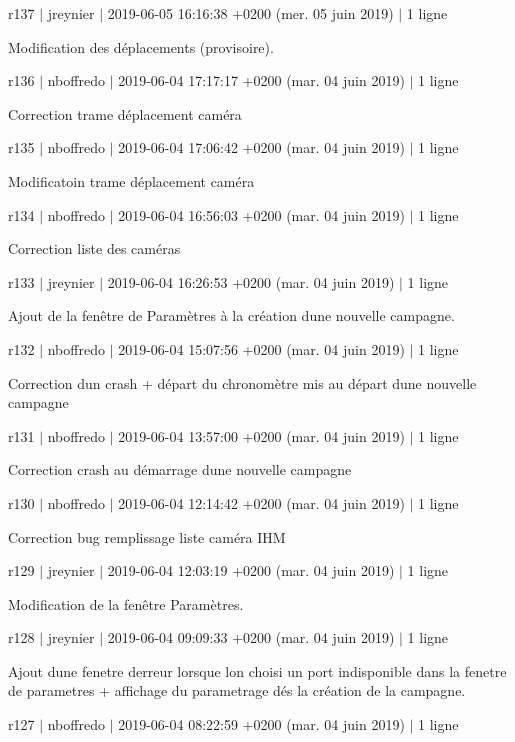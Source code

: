 r137 $\vert$ jreynier $\vert$ 2019-\/06-\/05 16\+:16\+:38 +0200 (mer. 05 juin 2019) $\vert$ 1 ligne

Modification des déplacements (provisoire).

r136 $\vert$ nboffredo $\vert$ 2019-\/06-\/04 17\+:17\+:17 +0200 (mar. 04 juin 2019) $\vert$ 1 ligne

Correction trame déplacement caméra

r135 $\vert$ nboffredo $\vert$ 2019-\/06-\/04 17\+:06\+:42 +0200 (mar. 04 juin 2019) $\vert$ 1 ligne

Modificatoin trame déplacement caméra

r134 $\vert$ nboffredo $\vert$ 2019-\/06-\/04 16\+:56\+:03 +0200 (mar. 04 juin 2019) $\vert$ 1 ligne

Correction liste des caméras

r133 $\vert$ jreynier $\vert$ 2019-\/06-\/04 16\+:26\+:53 +0200 (mar. 04 juin 2019) $\vert$ 1 ligne

Ajout de la fenêtre de Paramètres à la création d\textquotesingle{}une nouvelle campagne.

r132 $\vert$ nboffredo $\vert$ 2019-\/06-\/04 15\+:07\+:56 +0200 (mar. 04 juin 2019) $\vert$ 1 ligne

Correction d\textquotesingle{}un crash + départ du chronomètre mis au départ d\textquotesingle{}une nouvelle campagne

r131 $\vert$ nboffredo $\vert$ 2019-\/06-\/04 13\+:57\+:00 +0200 (mar. 04 juin 2019) $\vert$ 1 ligne

Correction crash au démarrage d\textquotesingle{}une nouvelle campagne

r130 $\vert$ nboffredo $\vert$ 2019-\/06-\/04 12\+:14\+:42 +0200 (mar. 04 juin 2019) $\vert$ 1 ligne

Correction bug remplissage liste caméra I\+HM

r129 $\vert$ jreynier $\vert$ 2019-\/06-\/04 12\+:03\+:19 +0200 (mar. 04 juin 2019) $\vert$ 1 ligne

Modification de la fenêtre Paramètres.

r128 $\vert$ jreynier $\vert$ 2019-\/06-\/04 09\+:09\+:33 +0200 (mar. 04 juin 2019) $\vert$ 1 ligne

Ajout d\textquotesingle{}une fenetre d\textquotesingle{}erreur lorsque l\textquotesingle{}on choisi un port indisponible dans la fenetre de parametres + affichage du parametrage dés la création de la campagne.

r127 $\vert$ nboffredo $\vert$ 2019-\/06-\/04 08\+:22\+:59 +0200 (mar. 04 juin 2019) $\vert$ 1 ligne

